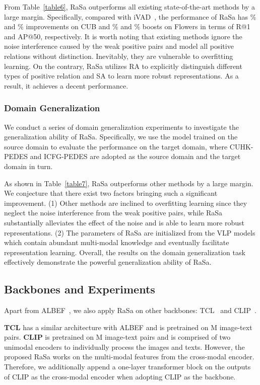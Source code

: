 \documentclass{article}
\begin{document}
From Table~\ref{table6}, RaSa outperforms all existing state-of-the-art methods by a large margin.
Specifically, compared with iVAD~\cite{wang2022improving}, the performance of RaSa has \% and \% improvements on CUB and \% and \% boosts on Flowers in terms of R@1 and AP@50, respectively.
It is worth noting that existing methods ignore the noise interference caused by the weak positive pairs and model all positive relations without distinction.
Inevitably, they are vulnerable to overfitting learning.
On the contrary, RaSa utilizes RA to explicitly distinguish different types of positive relation and SA to learn more robust representations.
As a result, it achieves a decent performance.


\subsubsection{Domain Generalization}
We conduct a series of domain generalization experiments to investigate the generalization ability of RaSa.
Specifically, we use the model trained on the source domain to evaluate the performance on the target domain, where CUHK-PEDES and ICFG-PEDES are adopted as the source domain and the target domain in turn.

As shown in Table~\ref{table7}, RaSa outperforms other methods by a large margin. 
We conjecture that there exist two factors bringing such a significant improvement.
(1) Other methods are inclined to overfitting learning since they neglect the noise interference from the weak positive pairs, while RaSa substantially alleviates the effect of the noise and is able to learn more robust representations.
(2) The parameters of RaSa are initialized from the VLP models which contain abundant multi-modal knowledge and eventually facilitate representation learning.
Overall, the results on the domain generalization task effectively demonstrate the powerful generalization ability of RaSa.



\subsection{Backbones and Experiments}
\label{backbones}
Apart from ALBEF~\cite{NEURIPS2021_50525975}, we also apply RaSa on other backbones: TCL~\cite{yang2022vision} and CLIP~\cite{radford2021learning}.

\textbf{TCL} has a similar architecture with ALBEF and is pretrained on M image-text pairs.
\textbf{CLIP} is pretrained on M image-text pairs and is comprised of two unimodal encoders to individually process the images and texts.
However, the proposed RaSa works on the multi-modal features from the cross-modal encoder.
Therefore, we additionally append a one-layer transformer block on the outputs of CLIP as the cross-modal encoder when adopting CLIP as the backbone. 
\end{document}
